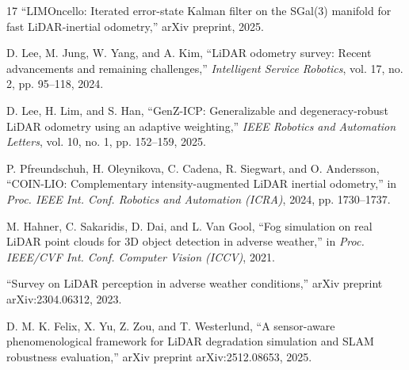 \documentclass[conference]{IEEEtran}
\begin{document}
\begin{thebibliography}{17}
 ``LIMOncello: Iterated error-state Kalman filter on the SGal(3) manifold for fast LiDAR-inertial odometry,'' arXiv preprint, 2025.

 D. Lee, M. Jung, W. Yang, and A. Kim, ``LiDAR odometry survey: Recent advancements and remaining challenges,'' \emph{Intelligent Service Robotics}, vol. 17, no. 2, pp. 95--118, 2024.

 D. Lee, H. Lim, and S. Han, ``GenZ-ICP: Generalizable and degeneracy-robust LiDAR odometry using an adaptive weighting,'' \emph{IEEE Robotics and Automation Letters}, vol. 10, no. 1, pp. 152--159, 2025.

 P. Pfreundschuh, H. Oleynikova, C. Cadena, R. Siegwart, and O. Andersson, ``COIN-LIO: Complementary intensity-augmented LiDAR inertial odometry,'' in \emph{Proc. IEEE Int. Conf. Robotics and Automation (ICRA)}, 2024, pp. 1730--1737.

 M. Hahner, C. Sakaridis, D. Dai, and L. Van Gool, ``Fog simulation on real LiDAR point clouds for 3D object detection in adverse weather,'' in \emph{Proc. IEEE/CVF Int. Conf. Computer Vision (ICCV)}, 2021.

 ``Survey on LiDAR perception in adverse weather conditions,'' arXiv preprint arXiv:2304.06312, 2023.

 D. M. K. Felix, X. Yu, Z. Zou, and T. Westerlund, ``A sensor-aware phenomenological framework for LiDAR degradation simulation and SLAM robustness evaluation,'' arXiv preprint arXiv:2512.08653, 2025.

\end{thebibliography}
\end{document}
